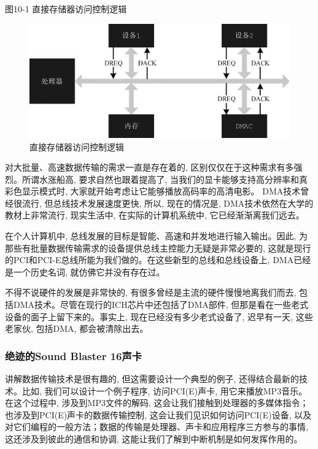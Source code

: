 \documentclass[12pt]{article}
\begin{document}
\begin{CJK}{UTF8}{gbsn}
图10-1  直接存储器访问控制逻辑
\begin{figure}
\begin{center}
\includegraphics[width=\textwidth]{eps/10-1.bmp.eps}
\caption{直接存储器访问控制逻辑}\label{dma}


\end{center}
\end{figure}



对大批量、高速数据传输的需求一直是存在着的, 区别仅仅在于这种需求有多强烈。所谓水涨船高, 要求自然也跟着提高了, 当我们的显卡能够支持高分辨率和真彩色显示模式时, 大家就开始考虑让它能够播放高码率的高清电影。
DMA技术曾经很流行, 但总线技术发展速度更快, 所以, 现在的情况是, DMA技术依然在大学的教材上非常流行, 现实生活中, 在实际的计算机系统中, 它已经渐渐离我们远去。

在个人计算机中, 总线发展的目标是智能、高速和并发地进行输入输出。因此, 为那些有批量数据传输需求的设备提供总线主控能力无疑是非常必要的, 这就是现行的PCI和PCI-E总线所能为我们做的。在这些新型的总线和总线设备上, DMA已经是一个历史名词, 就仿佛它并没有存在过。

不得不说硬件的发展是非常快的, 有很多曾经是主流的硬件慢慢地离我们而去, 包括DMA技术。尽管在现行的ICH芯片中还包括了DMA部件, 但那是看在一些老式设备的面子上留下来的。事实上, 现在已经没有多少老式设备了, 迟早有一天, 这些老家伙, 包括DMA, 都会被清除出去。

\subsubsection{绝迹的Sound Blaster 16声卡}
讲解数据传输技术是很有趣的, 但这需要设计一个典型的例子, 还得结合最新的技术。比如, 我们可以设计一个例子程序, 访问PCI(E)声卡, 用它来播放MP3音乐。在这个过程中, 涉及到MP3文件的解码, 这会让我们接触到处理器的多媒体指令；也涉及到PCI(E)声卡的数据传输控制, 这会让我们见识如何访问PCI(E)设备, 以及对它们编程的一般方法；数据的传输是处理器、声卡和应用程序三方参与的事情, 这还涉及到彼此的通信和协调, 这能让我们了解到中断机制是如何发挥作用的。


\end{CJK}
\end{document}
